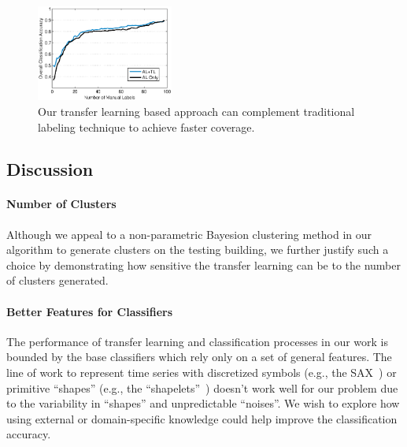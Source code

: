 \begin{figure}[t]
\centering
\includegraphics[width=0.4\textwidth]{./fig/tl_al.eps}
\caption{Our transfer learning based approach can complement traditional labeling technique to achieve faster coverage.}
\label{fig:comp}
\end{figure}


\subsection{Discussion}
\paragraph{Number of Clusters}
Although we appeal to a non-parametric Bayesion clustering method in our algorithm to generate clusters on the testing building, we further justify such a choice by demonstrating how sensitive the transfer learning can be to the number of clusters generated.

\paragraph{Better Features for Classifiers} The performance of transfer learning and classification processes in our work is bounded by the base classifiers which rely only on a set of general features. The line of work to represent time series with discretized symbols (e.g., the SAX~\cite{sax}) or primitive ``shapes'' (e.g., the ``shapelets''~\cite{shapelet1, shapelet2}) doesn't work well for our problem due to the variability in ``shapes'' and unpredictable ``noises''. We wish to explore how using external or domain-specific knowledge could help improve the classification accuracy. 

